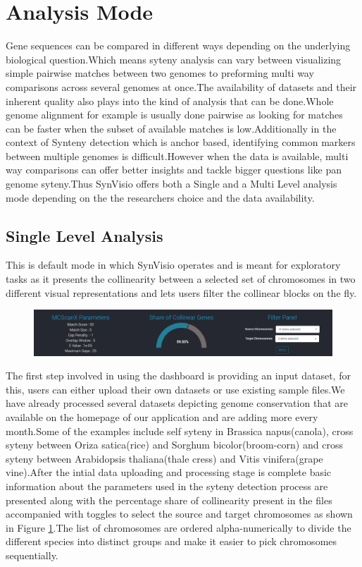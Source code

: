 \section{Analysis Mode}
Gene sequences can be compared in different ways depending on the underlying biological question.Which means syteny analysis can vary between visualizing simple pairwise matches between two genomes to preforming multi way comparisons across several genomes at once.The availability of datasets and their inherent quality also plays into the kind of analysis that can be done.Whole genome alignment for example is usually done pairwise as looking for matches can be faster when the subset of available matches is low.Additionally in the context of Synteny detection which is anchor   based, identifying common markers between multiple genomes is difficult.However when the data is available, multi way comparisons can offer better insights and tackle bigger questions like pan genome syteny.Thus SynVisio offers both a Single and a Multi Level analysis mode depending on the the researchers choice and the data availability.

\subsection{Single Level Analysis}
This is default mode in which SynVisio operates and is meant for exploratory tasks as it presents the collinearity between a selected set of chromosomes in two different visual representations and lets users filter the collinear blocks on the fly.

\begin{figure}
  \centering
  \includegraphics[width=1\linewidth]{images/ch_4_baseparameters.PNG}
  \label{fig:ch_4_baseparameters}
\end{figure}


The first step involved in using the dashboard is providing an input dataset, for this, users can either upload their own datasets or use existing sample files.We have already processed several datasets depicting genome conservation that are available on the homepage of our application and are adding more every month.Some of the examples include self syteny in Brassica napus(canola), cross syteny between Oriza satica(rice) and Sorghum bicolor(broom-corn) and cross syteny between Arabidopsis thaliana(thale cress) and Vitis vinifera(grape vine).After the intial data uploading and processing stage is complete basic information about the parameters used in the syteny detection process are presented along with the percentage share of collinearity present in the files accompanied with toggles to select the source and target chromosomes as shown in Figure \ref{fig:ch_4_baseparameters}.The list of chromosomes are ordered alpha-numerically to divide the different species into distinct groups and make it easier to pick chromosomes sequentially.

